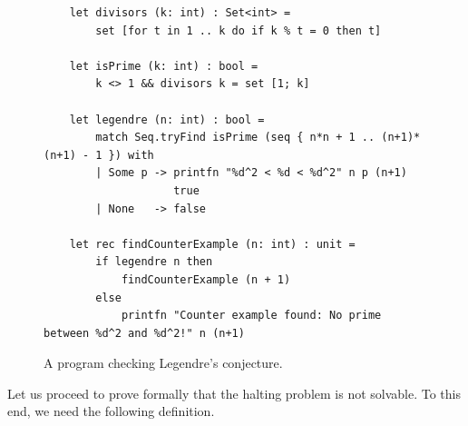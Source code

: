 \begin{figure}[!ht]
\centering
\begin{verbatim}
    let divisors (k: int) : Set<int> =
        set [for t in 1 .. k do if k % t = 0 then t]

    let isPrime (k: int) : bool =
        k <> 1 && divisors k = set [1; k]

    let legendre (n: int) : bool =
        match Seq.tryFind isPrime (seq { n*n + 1 .. (n+1)*(n+1) - 1 }) with
        | Some p -> printfn "%d^2 < %d < %d^2" n p (n+1)
                    true
        | None   -> false

    let rec findCounterExample (n: int) : unit =
        if legendre n then
            findCounterExample (n + 1)
        else
            printfn "Counter example found: No prime between %d^2 and %d^2!" n (n+1)
\end{verbatim}
\vspace*{-0.3cm}
\caption{A program checking Legendre's conjecture.}
\label{fig:legendre.stlx}
\end{figure}

Let us proceed to prove formally that the halting problem is not solvable.  To this end, we need the
following definition.

